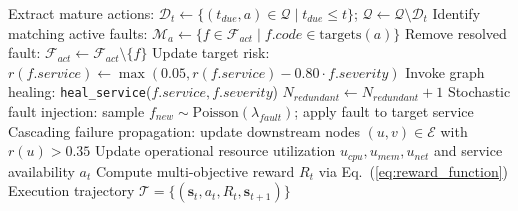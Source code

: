 \documentclass[ASNA,twocolumn]{USG}
\begin{document}
\begin{algorithm}[!htbp]
\begin{algorithmic}[1]
            \EndIf
        \EndIf
    \EndIf
    \State Extract mature actions: $\mathcal{D}_t \leftarrow \{(t_{due}, a) \in \mathcal{Q} \mid t_{due} \le t\}$; $\mathcal{Q} \leftarrow \mathcal{Q} \setminus \mathcal{D}_t$
     
        \State Identify matching active faults: $\mathcal{M}_a \leftarrow \{f \in \mathcal{F}_{act} \mid f.code \in \text{targets}(a)\}$
         
                \State Remove resolved fault: $\mathcal{F}_{act} \leftarrow \mathcal{F}_{act} \setminus \{f\}$
                \State Update target risk: $r(f.service) \leftarrow \max(0.05, r(f.service) - 0.80 \cdot f.severity)$
                \State Invoke graph healing: \texttt{heal\_service}($f.service, f.severity$)
            \EndFor
        \Else {}
            \State $N_{redundant} \leftarrow N_{redundant} + 1$ 
        \EndIf
    \EndFor
    \State Stochastic fault injection: sample $f_{new} \sim \text{Poisson}(\lambda_{fault})$; apply fault to target service
    \State Cascading failure propagation: update downstream nodes $(u, v) \in \mathcal{E}$ with $r(u) > 0.35$
    \State Update operational resource utilization $u_{cpu}, u_{mem}, u_{net}$ and service availability $a_t$
    \State Compute multi-objective reward $R_t$ via Eq.~(\ref{eq:reward_function})
\EndWhile
\State \Return Execution trajectory $\mathcal{T} = \{(\mathbf{s}_t, a_t, R_t, \mathbf{s}_{t+1})\}$
\end{algorithmic}
\end{algorithm}
\end{document}
